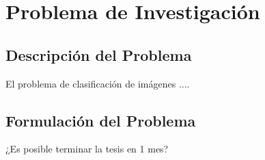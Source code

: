 \chapter{Problema de Investigación}
\label{chp:problema}
\section{Descripción del Problema}

El problema de clasificación de imágenes ....

\section{Formulación del Problema}
¿Es posible terminar la tesis en 1 mes?

